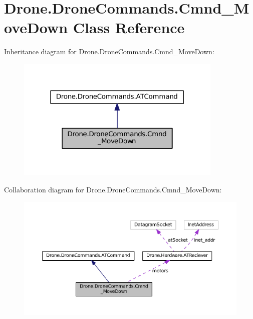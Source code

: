 \hypertarget{class_drone_1_1_drone_commands_1_1_cmnd___move_down}{}\section{Drone.\+Drone\+Commands.\+Cmnd\+\_\+\+Move\+Down Class Reference}
\label{class_drone_1_1_drone_commands_1_1_cmnd___move_down}


Inheritance diagram for Drone.\+Drone\+Commands.\+Cmnd\+\_\+\+Move\+Down\+:\nopagebreak
\begin{figure}[H]
\begin{center}
\leavevmode
\includegraphics[width=279pt]{class_drone_1_1_drone_commands_1_1_cmnd___move_down__inherit__graph}
\end{center}
\end{figure}


Collaboration diagram for Drone.\+Drone\+Commands.\+Cmnd\+\_\+\+Move\+Down\+:\nopagebreak
\begin{figure}[H]
\begin{center}
\leavevmode
\includegraphics[width=350pt]{class_drone_1_1_drone_commands_1_1_cmnd___move_down__coll__graph}
\end{center}
\end{figure}
